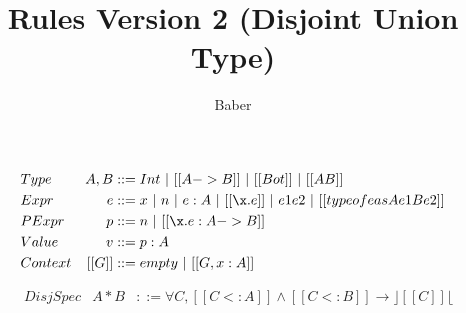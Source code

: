 \documentclass[a4paper]{article}
\title{Rules Version 2 (Disjoint Union Type)}
\author{Baber}
\begin{document}
\maketitle

\begin{align*}
&Type &A, B&::= Int ~|~ [[A->B]]~ | ~[[Bot]]~ |~ [[A \/ B]]\\
&Expr &e &::= x ~|~ n ~|~ e:A ~|~[[\x.e]] ~ | ~ e1e2 ~|~ [[typeof e as A e1 B e2]]\\
&PExpr & p &::= n ~|~ [[\x.e : A->B]] \\
&Value &v &::= p : A \\
&Context & [[G]] &::= empty~ |~ [[G , x : A]]
\end{align*}

\begin{align*}
&DisjSpec & A * B & ::= \forall C, [[C <: A]] \wedge [[C <: B]] \rightarrow  \rfloor [[C]] \lfloor
\end{align*}

\bigskip

\ottdefnsBottomLike

\ottdefnsDisjointness

\ottdefnsSubtyping

\ottdefnsTyping

\ottdefnsReduction
\end{document}
